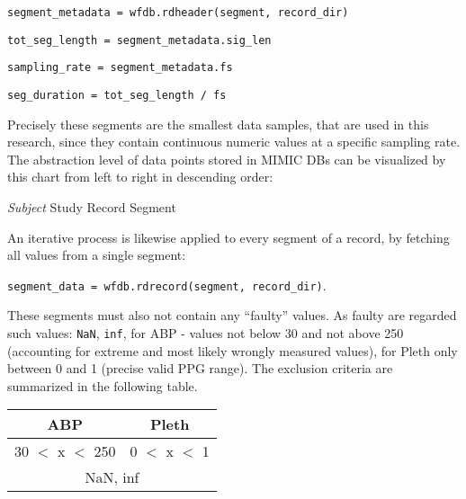 \vspace{0.1cm}
\qquad\qquad\qquad \texttt{segment\_metadata = wfdb.rdheader(segment, record\_dir)}

\qquad\qquad\qquad \texttt{tot\_seg\_length = segment\_metadata.sig\_len}

\qquad\qquad\qquad \texttt{sampling\_rate = segment\_metadata.fs}

\qquad\qquad\qquad \texttt{seg\_duration = tot\_seg\_length / fs}
\vspace{0.1cm}

Precisely these segments are the smallest data samples, that are used in this research, since they contain continuous numeric values at a specific sampling rate.
The abstraction level of data points stored in MIMIC DBs can be visualized by this chart from left to right in descending order:

\vspace{0.1cm}
{\centering \textit{Subject} \rightarrow Study \rightarrow Record \rightarrow Segment\par}
\vspace{0.1cm}

An iterative process is likewise applied to every segment of a record, by fetching all values from a single segment:

\vspace{0.1cm}
{\centering \texttt{segment\_data = wfdb.rdrecord(segment, record\_dir)}.\par}
\vspace{0.1cm}

\noindent These segments must also not contain any \enquote{faulty} values.
As faulty are regarded such values: \texttt{NaN}, \texttt{inf}, for ABP - values not below 30 and not above 250 (accounting for extreme and most likely wrongly measured values), for Pleth only between 0 and 1 (precise valid PPG range).
The exclusion criteria are summarized in the following table.

\begin{center}
    \begin{tabular}{ |c|c| }
        \hline
        ABP              & Pleth         \\
        \hline
        30 $<$ x $<$ 250 & 0 $<$ x $<$ 1 \\
        \hline
        \multicolumn{2}{|c|}{NaN, inf} \\
        \hline
    \end{tabular}
\end{center}


